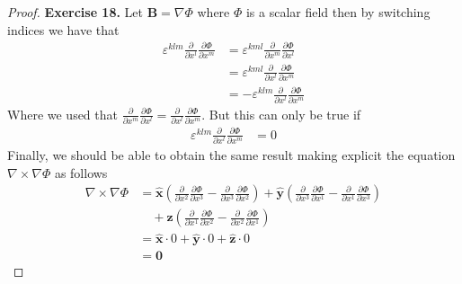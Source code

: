 \documentclass[11pt]{article}
\theoremstyle{definition}
\begin{document}
\begin{proof}{\textbf{Exercise 18.}}
    Let $\bm B = \nabla\Phi$ where $\Phi$ is a scalar field then
    by switching indices we have that
    \begin{align*}
        \varepsilon^{klm}
        \frac{\partial}{\partial x^l} \frac{\partial \Phi}{\partial x^m}
        &=\varepsilon^{kml}
        \frac{\partial}{\partial x^m} \frac{\partial \Phi}{\partial x^l}\\
        &=\varepsilon^{kml}
        \frac{\partial}{\partial x^l} \frac{\partial \Phi}{\partial x^m}\\
        &= -\varepsilon^{klm}
        \frac{\partial}{\partial x^l} \frac{\partial \Phi}{\partial x^m}
    \end{align*}
    Where we used that
    $\frac{\partial}{\partial x^m} \frac{\partial \Phi}{\partial x^l} 
    = \frac{\partial}{\partial x^l} \frac{\partial \Phi}{\partial x^m}$.
    But this can only be true if 
    \begin{align*}
        \varepsilon^{klm}
        \frac{\partial}{\partial x^l} \frac{\partial \Phi}{\partial x^m}
        &= 0 
    \end{align*}
    Finally, we should be able to obtain the same result making explicit the equation
    $\nabla \times \nabla \Phi$ as follows
    \begin{align*}
        \nabla \times \nabla \Phi &=
        \hat{\bm x} \left(
            \frac{\partial}{\partial x^2}
            \frac{\partial \Phi}{\partial x^3}
            - \frac{\partial}{\partial x^3}
            \frac{\partial \Phi}{\partial x^2}
        \right)
        + \hat{\bm y} \left(
            \frac{\partial}{\partial x^3}
            \frac{\partial \Phi}{\partial x^1}
            - \frac{\partial}{\partial x^1}
            \frac{\partial \Phi}{\partial x^3}
        \right)\\
        &\quad + \hat{\bm z} \left(
            \frac{\partial}{\partial x^1}
            \frac{\partial \Phi}{\partial x^2}
            - \frac{\partial}{\partial x^2}
            \frac{\partial \Phi}{\partial x^1}
        \right)\\
        &= \hat{\bm x} \cdot 0 + \hat{\bm y}\cdot 0 + \hat{\bm{z}}\cdot 0\\
        &= \bm 0
    \end{align*}
\end{proof}
\cleardoublepage
\end{document}
